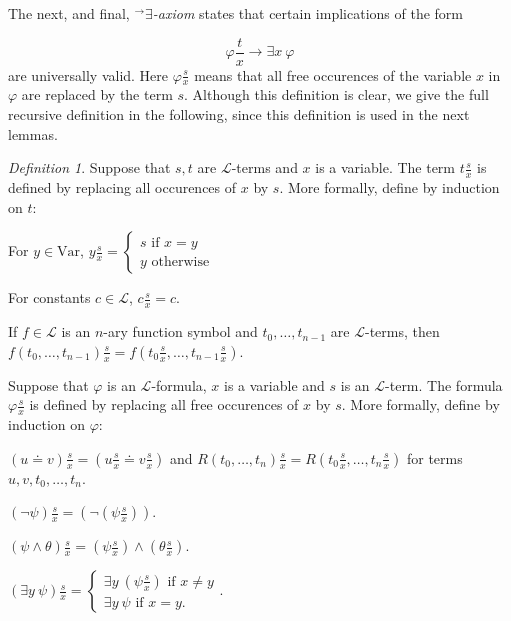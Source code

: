 \documentclass[a4paper, 11pt]{amsart}
\theoremstyle{remark}
\newtheorem{definition}[definition]{Definition}
\newcommand{\cL}{\mathcal L}
\newcommand{\Var}{\mathrm{Var}}
\newenvironment{enumerate-(1)}{\begin{enumerate}[label={\upshape (\arabic*)}, leftmargin=2pc]}{\end{enumerate}}
\begin{document}
The next, and final, \emph{${}^\rightarrow$$\exists$-axiom} states that certain implications of the form 

$$ \varphi \frac{t}{x} \rightarrow \exists x\ \varphi$$ 
are universally valid. 
Here $\varphi\frac{s}{x}$ means that all free occurences of the variable $x$ in $\varphi$ are replaced by the term $s$. 
Although this definition is clear, we give the full recursive definition in the following, since this definition is used in the next lemmas. 

\begin{definition} 
Suppose that $s,t$ are $\cL$-terms and $x$ is a variable. 
The term $t\frac{s}{x}$ is defined by replacing all occurences of $x$ by $s$. More formally, define by induction on $t$: 
\begin{enumerate-(1)} 
\item 
For $y\in \Var$, 
$ y \frac{s}{x} = 
\begin{cases} 
s \text{ if } x=y\\ 
y \text{ otherwise} 
\end{cases}   $ 
\item 
For constants $c\in \cL$, $c\frac{s}{x}= c$. 
\item 
If $f\in \cL$ is an $n$-ary function symbol and $t_0,\dots,t_{n-1}$ are $\cL$-terms, then $f(t_0,\dots,t_{n-1})\frac{s}{x}=f(t_0 \frac{s}{x}, \dots, t_{n-1}\frac{s}{x})$. 
\end{enumerate-(1)} 

Suppose that $\varphi$ is an $\cL$-formula, $x$ is a variable and $s$ is an $\cL$-term. 
The formula $\varphi \frac{s}{x}$ is defined by replacing all free occurences of $x$ by $s$. 
More formally, define by induction on $\varphi$: 

\begin{enumerate-(1)} 
\item 
$(u\doteq v) \frac{s}{x} = (u\frac{s}{x} \doteq v\frac{s}{x})$ and $R(t_0,\dots,t_n)\frac{s}{x}=R(t_0\frac{s}{x},\dots,t_n\frac{s}{x})$ for terms $u,v, t_0,\dots,t_n$. 
\item 
$(\neg\psi)\frac{s}{x}= (\neg(\psi\frac{s}{x}))$. 
\item 
$(\psi\wedge \theta) \frac{s}{x} =(\psi\frac{s}{x})\wedge (\theta\frac{s}{x})$. 
\item 
$ (\exists y\ \psi) \frac{s}{x} = \begin{cases} 
\exists y\ (\psi \frac{s}{x}) \text{ if } x\neq y \\ 
\exists y\ \psi \text{ if }  x=y. 
\end{cases} .$ 
\end{enumerate-(1)} 

\end{definition} 
\end{document}

